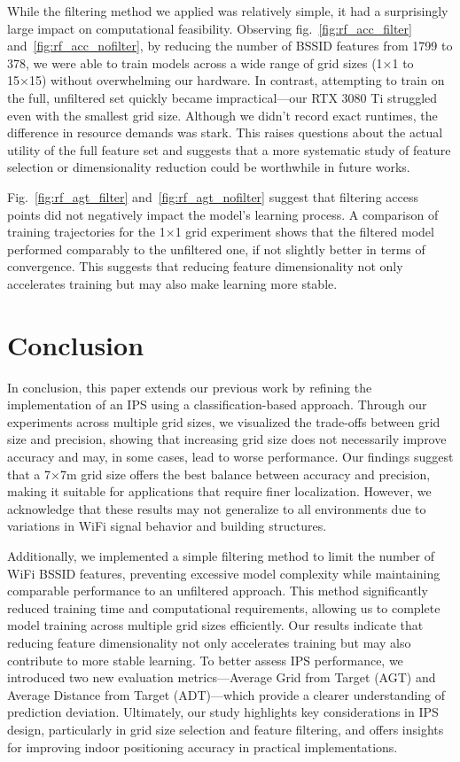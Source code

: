 \documentclass[conference]{IEEEtran}
\begin{document}
	While the filtering method we applied was relatively simple, it had a surprisingly large impact on computational feasibility. Observing fig.~\ref{fig:rf_acc_filter} and~\ref{fig:rf_acc_nofilter}, by reducing the number of BSSID features from 1799 to 378, we were able to train models across a wide range of grid sizes (1×1 to 15×15) without overwhelming our hardware. In contrast, attempting to train on the full, unfiltered set quickly became impractical—our RTX 3080 Ti struggled even with the smallest grid size. Although we didn’t record exact runtimes, the difference in resource demands was stark. This raises questions about the actual utility of the full feature set and suggests that a more systematic study of feature selection or dimensionality reduction could be worthwhile in future works.
	
	Fig.~\ref{fig:rf_agt_filter} and~\ref{fig:rf_agt_nofilter} suggest that filtering access points did not negatively impact the model's learning process. A comparison of training trajectories for the 1×1 grid experiment shows that the filtered model performed comparably to the unfiltered one, if not slightly better in terms of convergence. This suggests that reducing feature dimensionality not only accelerates training but may also make learning more stable.
	
	

	
	
	
	\section{Conclusion}
	In conclusion, this paper extends our previous work by refining the implementation of an IPS using a classification-based approach. Through our experiments across multiple grid sizes, we visualized the trade-offs between grid size and precision, showing that increasing grid size does not necessarily improve accuracy and may, in some cases, lead to worse performance. Our findings suggest that a 7×7m grid size offers the best balance between accuracy and precision, making it suitable for applications that require finer localization. However, we acknowledge that these results may not generalize to all environments due to variations in WiFi signal behavior and building structures.
	
	Additionally, we implemented a simple filtering method to limit the number of WiFi BSSID features, preventing excessive model complexity while maintaining comparable performance to an unfiltered approach. This method significantly reduced training time and computational requirements, allowing us to complete model training across multiple grid sizes efficiently. Our results indicate that reducing feature dimensionality not only accelerates training but may also contribute to more stable learning. To better assess IPS performance, we introduced two new evaluation metrics—Average Grid from Target (AGT) and Average Distance from Target (ADT)—which provide a clearer understanding of prediction deviation. Ultimately, our study highlights key considerations in IPS design, particularly in grid size selection and feature filtering, and offers insights for improving indoor positioning accuracy in practical implementations.
	
\end{document}
